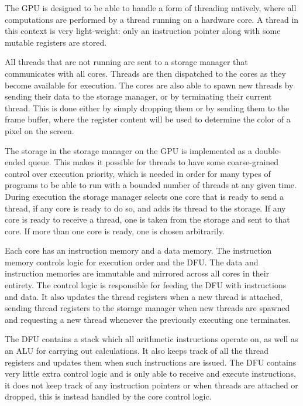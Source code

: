			The GPU is designed to be able to handle a form of threading
			natively, where all computations are performed by a thread running
			on a hardware core. A thread in this context is very light-weight:
			only an instruction pointer along with some mutable registers are
			stored.

			All threads that are not running are sent to a storage manager that
			communicates with all cores. Threads are then dispatched to the 
			cores as they become available for execution. The cores are also 
			able to spawn new threads by sending their data to the storage 
			manager, or by terminating their current thread. This is done 
			either by simply dropping them or by sending them to the frame 
			buffer, where the register content will be used to determine the 
			color of a pixel on the screen.

			The storage in the storage manager on the GPU is implemented
			as a double-ended queue. This makes it possible for threads to have
			some coarse-grained control over execution priority, which is
			needed in order for many types of programs to be able to run with a
			bounded number of threads at any given time. During execution the
			storage manager selects one core that is ready to send a thread, if
			any core is ready to do so, and adds its thread to the storage. If
			any core is ready to receive a thread, one is taken from the 
			storage and sent to that core. If more than one core is ready, one
			is chosen arbitrarily.

			Each core has an instruction memory and a data memory. The
			instruction memory controls logic for execution order and the DFU.
			The data and instruction memories are immutable and mirrored across
			all cores in their entirety. The control logic is responsible for
			feeding the DFU with instructions and data. It also updates the
			thread registers when a new thread is attached, sending thread
			registers to the storage manager when new threads are spawned and
			requesting a new thread whenever the previously executing one
			terminates.
			
			The DFU contains a stack which all arithmetic instructions operate
			on, as well as an ALU for carrying out calculations. It also keeps
			track of all the thread registers and updates them when such
			instructions are issued. The DFU contains very little extra control
			logic and is only able to receive and execute instructions, it does
			not keep track of any instruction pointers or when threads are
			attached or dropped, this is instead handled by the core control
			logic.

